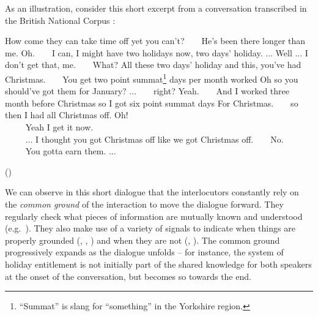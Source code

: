 As an illustration, consider this short excerpt from a conversation transcribed in the British National Corpus \citep{bnc} :

\begin{dialogue} 
 How come they can take time off yet you can't?
 $\ \ \ \ \ \ $ He's been there longer than me.
 Oh.
  $\ \ \ \ \ \ $ I can, I might have two holidays now, two days' holiday. ...
 Well ... I don't get that, me.
  $\ \ \ \ \ \ $ What?
 All these two days' holiday and this, you've had Christmas.
  $\ \ \ \ \ \ $ You get two point summat\footnote{``Summat'' is slang for ``something'' in the Yorkshire region. } days per month worked
 Oh so you should've got them for January? ...
  $\ \ \ \ \ \ $ right?
 Yeah.
  $\ \ \ \ \ \ $ And I worked three month before Christmas so I got six point summat days
 For Christmas.
  $\ \ \ \ \ \ $ so then I had all Christmas off.
 Oh! \\
 $\phantom{a} \ \ \ \ \ \ \ $ Yeah I get it now. \\
 $\phantom{a} \ \ \ \ \ \ \ $ ... I thought you got Christmas off like we got Christmas off.
  $\ \ \ \ \ \ $ No. \\ 
 $\phantom{a} \ \ \ \ \ \ \ $ You gotta earn them. ... \vspace{-2mm}
 \begin{flushright}\begin{scriptsize}()\end{scriptsize}\end{flushright} 
\end{dialogue} 

We can observe in this short dialogue that the interlocutors constantly rely on the \textit{common ground} of the interaction to move the dialogue forward.  They regularly check what pieces of information are mutually known and understood (e.g.\ ).  They also make use of a variety of signals to indicate when things are properly grounded (, , ) and when they are not (, ). The common ground progressively expands as the dialogue unfolds -- for instance, the system of holiday entitlement is not initially part of the shared knowledge for both speakers at the onset of the conversation, but becomes so towards the end. 

